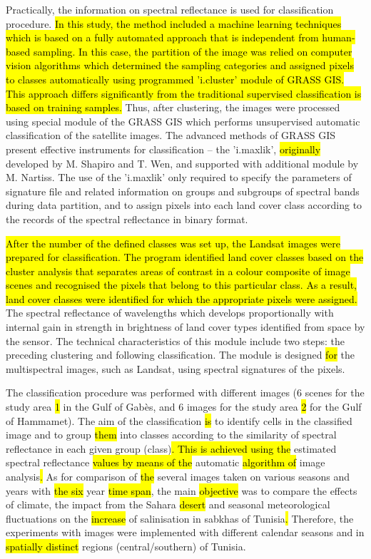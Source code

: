 \documentclass[land,article,submit,pdftex,moreauthors]{Definitions/mdpi}
\begin{document}
Practically, the information on spectral reflectance is used for classification procedure. \hl{In this study, the method included a machine learning techniques which is based on a fully automated approach that is independent from human-based sampling. In this case, the partition of the image was relied on computer vision algorithms which determined the sampling categories and assigned pixels to classes automatically using programmed 'i.cluster' module of GRASS GIS. This approach differs significantly from the traditional supervised classification is based on training samples. }Thus, after clustering, the images were processed using special module of the GRASS GIS which performs unsupervised automatic classification of the satellite images. The advanced methods of GRASS GIS present effective instruments for classification -- the 'i.maxlik', \hl{originally }developed by M. Shapiro and T. Wen, and supported with additional module by M. Nartiss. The use of the 'i.maxlik' only required to specify the parameters of signature file and related information on groups and subgroups of spectral bands during data partition, and to assign pixels into each land cover class according to the records of the spectral reflectance in binary format. 

\hl{After the number of the defined classes was set up, the Landsat images were prepared for classification. The program identified land cover classes based on the cluster analysis that separates areas of contrast in a colour composite of image scenes and recognised the pixels that belong to this particular class. As a result, land cover classes were identified for which the appropriate pixels were assigned. }The spectral reflectance of wavelengths which develops proportionally with internal gain in strength in brightness of land cover types identified from space by the sensor. The technical characteristics of this module include two steps: the preceding clustering and following classification. The module is designed \hl{for} the multispectral images, such as Landsat, using spectral signatures of the pixels. 

The classification procedure was performed with different images (6 scenes for the study area \hl{1} in the Gulf of Gabès, and 6 images for the study area \hl{2} for the Gulf of Hammamet). The aim of the classification \hl{is }to identify cells in the classified image and to group \hl{them} into classes according to the similarity of spectral reflectance in each given group (class)\hl{. This is achieved using the }estimated spectral reflectance \hl{values by means of the } automatic \hl{algorithm of }image analysis\hl{. }As for comparison of \hl{the }several images taken on various seasons and\hl{ }years with \hl{the six} year \hl{time span}, the main \hl{objective} was to compare the effects of climate, the impact from the Sahara \hl{desert }and seasonal meteorological fluctuations on the \hl{increase} of salinisation in sabkhas of Tunisia\hl{. }Therefore, the experiments with images were implemented with different calendar seasons and in \hl{spatially distinct} regions (central/southern) of Tunisia. 
\end{document}
